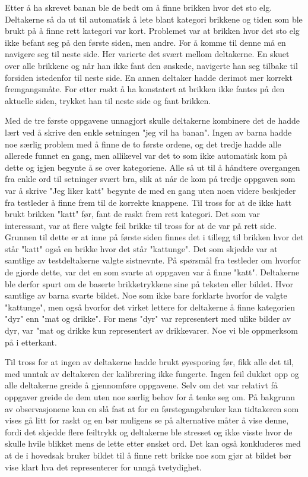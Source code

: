  
Etter å ha skrevet banan ble de bedt om å finne brikken hvor det sto elg. Deltakerne så da ut til automatisk å lete blant kategori brikkene og tiden som ble brukt på å finne rett kategori var kort. Problemet var at brikken hvor det sto elg ikke befant seg på den første siden, men andre. For å komme til denne må en navigere seg til neste side. Her varierte det svært mellom deltakerne. En skuet over alle brikkene og når han ikke fant den ønskede, navigerte han seg tilbake til forsiden istedenfor til neste side. En annen deltaker hadde derimot mer korrekt fremgangsmåte. For etter raskt å ha konstatert at brikken ikke fantes på den aktuelle siden, trykket han til neste side og fant brikken.  
 
Med de tre første oppgavene unnagjort skulle deltakerne kombinere det de hadde lært ved å skrive den enkle setningen "jeg vil ha banan". Ingen av barna hadde noe særlig problem med å finne de to første ordene, og det tredje hadde alle allerede funnet en gang, men allikevel var det to som ikke automatisk kom på dette og igjen begynte å se over kategoriene. Alle så ut til å håndtere overgangen fra enkle ord til setninger svært bra, slik at når de kom på tredje oppgaven som var å skrive "Jeg liker katt" begynte de med en gang uten noen videre beskjeder fra testleder å finne frem til de korrekte knappene. Til tross for at de ikke hatt brukt brikken "katt" før, fant de raskt frem rett kategori. Det som var interessant, var at flere valgte feil brikke til tross for at de var på rett side. Grunnen til dette er at inne på første siden finnes det i tillegg til brikken hvor det står "katt" også en brikke hvor det står "kattunge". Det som skjedde var at samtlige av testdeltakerne valgte sistnevnte. På spørsmål fra testleder om hvorfor de gjorde dette, var det en som svarte at oppgaven var å finne "katt". Deltakerne ble derfor spurt om de baserte brikketrykkene sine på teksten eller bildet. Hvor samtlige av barna svarte bildet. Noe som ikke bare forklarte hvorfor de valgte "kattunge", men også hvorfor det virket lettere for deltakerne å finne kategorien "dyr" enn "mat og drikke". For mens "dyr" var representert med ulike bilder av dyr, var "mat og drikke kun representert av drikkevarer. Noe vi ble oppmerksom på i etterkant. 
 
Til tross for at ingen av deltakerne hadde brukt øyesporing før, fikk alle det til, med unntak av deltakeren der kalibrering ikke fungerte. Ingen feil dukket opp og alle deltakerne greide å gjennomføre oppgavene. Selv om det var relativt få oppgaver greide de dem uten noe særlig behov for å tenke seg om. På bakgrunn av observasjonene kan en slå fast at for en førstegangsbruker kan tidtakeren som vises gå litt for raskt og en bør muligens se på alternative måter å vise denne, fordi det skjedde flere feiltrykk og deltakerne ble stresset og ikke visste hvor de skulle hvile blikket mens de lette etter ønsket ord. Det kan også konkluderes med at de i hovedsak bruker bildet til å finne rett brikke noe som gjør at bildet bør vise klart hva det representerer for unngå tvetydighet.  
 

